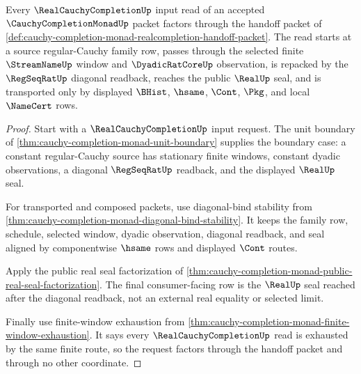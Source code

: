 \begin{theorem}
\label{thm:cauchy-completion-monad-realcompletion-input-factorization}
Every $\RealCauchyCompletionUp$ input read of an accepted $\CauchyCompletionMonadUp$ packet factors through the handoff packet of \autoref{def:cauchy-completion-monad-realcompletion-handoff-packet}. The read starts at a source regular-Cauchy family row, passes through the selected finite $\StreamNameUp$ window and $\DyadicRatCoreUp$ observation, is repacked by the $\RegSeqRatUp$ diagonal readback, reaches the public $\RealUp$ seal, and is transported only by displayed $\BHist$, $\hsame$, $\Cont$, $\Pkg$, and local $\NameCert$ rows.
\end{theorem}
\begin{proof}
Start with a $\RealCauchyCompletionUp$ input request. The unit boundary of \autoref{thm:cauchy-completion-monad-unit-boundary} supplies the boundary case: a constant regular-Cauchy source has stationary finite windows, constant dyadic observations, a diagonal $\RegSeqRatUp$ readback, and the displayed $\RealUp$ seal.

For transported and composed packets, use diagonal-bind stability from \autoref{thm:cauchy-completion-monad-diagonal-bind-stability}. It keeps the family row, schedule, selected window, dyadic observation, diagonal readback, and seal aligned by componentwise $\hsame$ rows and displayed $\Cont$ routes.

Apply the public real seal factorization of \autoref{thm:cauchy-completion-monad-public-real-seal-factorization}. The final consumer-facing row is the $\RealUp$ seal reached after the diagonal readback, not an external real equality or selected limit.

Finally use finite-window exhaustion from \autoref{thm:cauchy-completion-monad-finite-window-exhaustion}. It says every $\RealCauchyCompletionUp$ read is exhausted by the same finite route, so the request factors through the handoff packet and through no other coordinate.
\end{proof}

